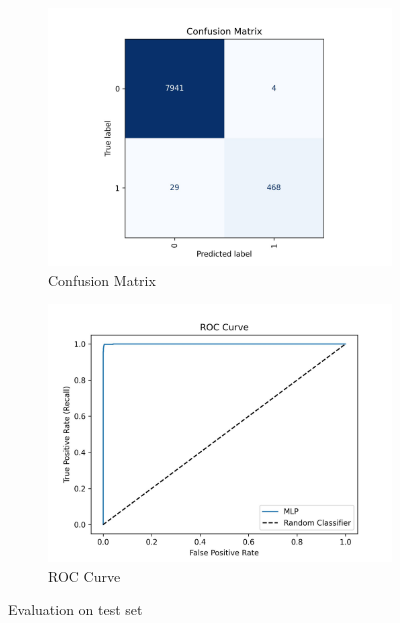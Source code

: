 \documentclass[a4paper,fleqn]{cas-sc}
\begin{document}
	\begin{figure}[h]
		\centering
		\begin{subfigure}[b]{0.45\linewidth}
			\includegraphics[width=1\linewidth]{figures/confusion-matrix.jpg}
			\caption{Confusion Matrix}
			\label{fig:confusion-matrix}
		\end{subfigure}
		\begin{subfigure}[b]{0.45\linewidth}
			\includegraphics[width=\linewidth]{figures/roc-curve.jpg}
			\caption{ROC Curve}
			\label{fig:roc-curve}
		\end{subfigure}
		\caption{Evaluation on test set}
		\label{fig:evaluation-test-set}
	\end{figure}
	
\end{document}
